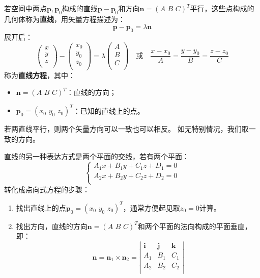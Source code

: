 \begin{definition}[直线方程]
若空间中两点$\boldsymbol{p},\boldsymbol{p}_0$构成的直线$\boldsymbol{p}-\boldsymbol{p}_0$和方向$\boldsymbol{n}=\left( A\,\,B\,\,C \right) ^T$平行，这些点构成的几何体称为{\bf 直线}，用矢量方程描述为：
\[
\boldsymbol{p}-\boldsymbol{p}_0=\lambda \boldsymbol{n}
\]
展开后：
\[
\left( \begin{array}{c}
	x\\
	y\\
	z\\
\end{array} \right) -\left( \begin{array}{c}
	x_0\\
	y_0\\
	z_0\\
\end{array} \right) =\lambda \left( \begin{array}{c}
	A\\
	B\\
	C\\
\end{array} \right) \quad \text{或} \quad \frac{x-x_0}{A}=\frac{y-y_0}{B}=\frac{z-z_0}{C}
\]
称为{\bf 直线方程}，其中：
\begin{itemize}
    \item $\boldsymbol{n}=\left( A\,\,B\,\,C \right) ^T$：直线的方向；
    \item $\boldsymbol{p}_0=\left( x_0\,\,y_0\,\,z_0 \right) ^T$：已知的直线上的点。
\end{itemize}
\end{definition}

若两直线平行，则两个矢量方向可以一致也可以相反。
如无特别情况，我们取一致的方向。

直线的另一种表达方式是两个平面的交线，若有两个平面：
\[
\begin{cases}
	A_1x+B_1y+C_1z+D_1=0\\
	A_2x+B_2y+C_2z+D_2=0\\
\end{cases}
\]
转化成点向式方程的步骤：
\begin{enumerate}
    \item 找出直线上的点$\boldsymbol{p}_0=\left( x_0\,\,y_0\,\,z_0 \right) ^T$，通常方便起见取$z_0=0$计算。
    \item 找出方向，直线的方向$\boldsymbol{n}=\left( A\,\,B\,\,C \right) ^T$和两个平面的法向构成的平面垂直，即：
    \[
    \boldsymbol{n}=\boldsymbol{n}_1\times \boldsymbol{n}_2=\left| \begin{matrix}
        \mathbf{i}&		\mathbf{j}&		\mathbf{k}\\
        A_1&		B_1&		C_1\\
        A_2&		B_2&		C_2\\
    \end{matrix} \right|
    \]
\end{enumerate}


